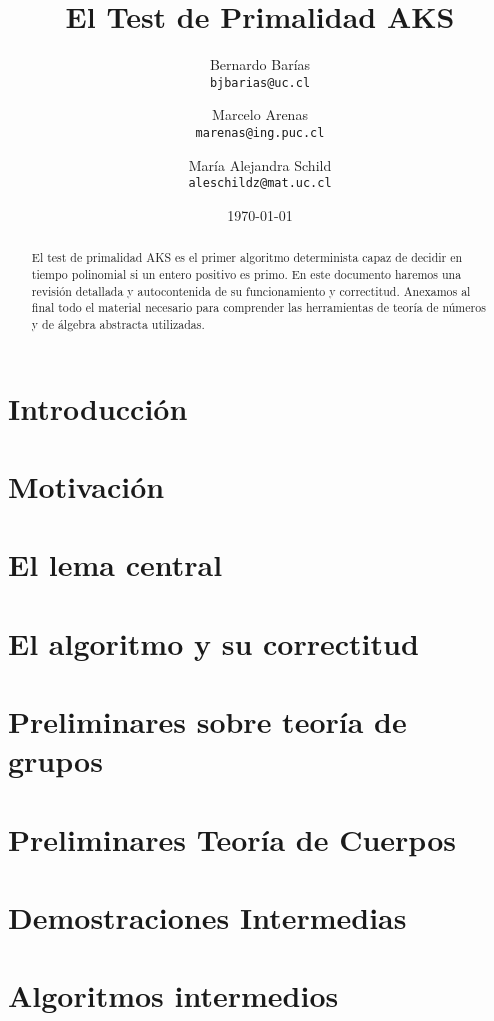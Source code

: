 \documentclass[10pt]{article}
\title{{\bf El Test de Primalidad AKS}}
\author{Bernardo Barías \\ 
\texttt{bjbarias@uc.cl}
\and 
Marcelo Arenas\\
\texttt{marenas@ing.puc.cl}
\and
María Alejandra Schild\\
\texttt{aleschildz@mat.uc.cl}}
\date{\today}
\newcommand{\0}{\mathbf{0}}
\newcommand{\1}{\mathbf{1}}
\newcommand{\+}{\oplus}
\theoremstyle{definition}
\theoremstyle{remark}
\theoremstyle{remark}
\begin{document}
	
	\maketitle
	
	
	\begin{abstract}
\noindent El test de primalidad AKS \cite{AKS04} es el primer algoritmo
determinista capaz de decidir en tiempo polinomial si un entero positivo es primo.
En este documento haremos una revisión detallada y autocontenida de su funcionamiento y correctitud. Anexamos al final todo el material necesario para comprender las herramientas de teoría de números y de álgebra abstracta utilizadas.
\end{abstract}


\section{Introducción}


\section{Motivación}
\label{sec-notacion}


    
\section{El lema central}
\label{sec-lema-central}

	
\section{El algoritmo y su correctitud}
\label{sec-algoritmo-correctitud}





\appendix

\newpage


\section{Preliminares sobre teoría de grupos}
\label{app-grupos}



\section{Preliminares Teoría de Cuerpos}
\label{app-cuerpos}




\section{Demostraciones Intermedias}
\label{sec-demos-inter}



\section{Algoritmos intermedios}
\label{sec-app-alg-int}

\end{document}
